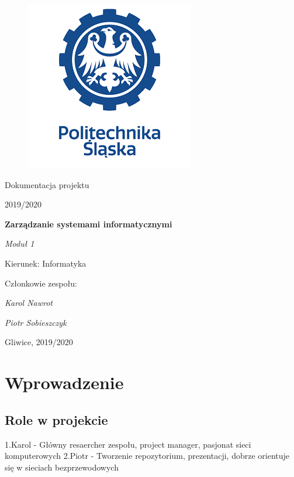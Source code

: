 \documentclass[12pt,a4paper]{article}
\begin{document}
\clearpage
\begin{figure}[h]
\centering
\includegraphics{ps-logo.png}
\end{figure}
\hspace{3cm}
\begin{center}Dokumentacja projektu\end{center}
\begin{center}2019/2020\end{center}
\hspace{3cm}
\begin{center}\large\textbf{Zarządzanie systemami informatycznymi}\end{center}
\begin{center}\large\textit{Moduł 1}\end{center}

\hspace{7cm}
\begin{flushright}Kierunek: Informatyka
\end{flushright}
\begin{flushright}Członkowie zespołu:
\par
\textit{Karol Nawrot}
\par
\textit{Piotr Sobieszczyk}
\end{flushright}
\vfill
\begin{center}Gliwice, 2019/2020\end{center}

\newpage
{}
\tableofcontents

\newpage
\section{Wprowadzenie}

\subsection{Role w projekcie}
1.Karol - Główny resaercher zespołu, project manager, pasjonat sieci komputerowych \newline
2.Piotr - Tworzenie repozytorium, prezentacji, dobrze orientuje się w sieciach bezprzewodowych
\end{document}
